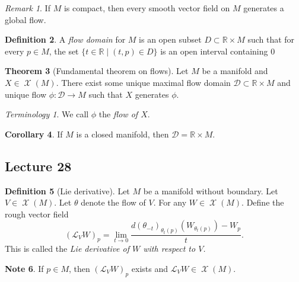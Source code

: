 \documentclass[10pt,letterpaper,cm]{nupset}
\theoremstyle{definition}
\newtheorem{definition}{Definition}[subsection]
\newtheorem{note}[definition]{Note}
\theoremstyle{theorem}
\newtheorem{theorem}[definition]{Theorem}
\newtheorem{corollary}[definition]{Corollary}
\theoremstyle{remark}
\newtheorem{remark}[definition]{Remark}
\newtheorem*{term}{Terminology}
\newcommand{\R}{\mathbb R}
\newcommand{\1}{\mathbf{1}}
\newcommand{\0}{\vec 0}
\DeclareMathOperator{\vf}{\mathscr{X}}
\begin{document}
\begin{remark}
If $M$ is compact, then every smooth vector field on $M$ generates a global flow.
\end{remark}

\begin{definition}
A \textit{flow domain} for $M$ is an open subset $D\subset \R \times M$ such that for every $p\in M$, the set $\{t\in \R \mid \left(t, p\right) \in D\}$ is an open interval containing $0$
\end{definition}

\begin{theorem}[Fundamental theorem on flows]
Let $M$ be a manifold and $X\in \vf(M)$. There exist some unique maximal flow domain $\mathcal{D}\subset \R \times M$ and unique flow $\phi: \mathcal{D}  \to M$ such that $X$ generates $\phi$.
\end{theorem}

\begin{term}
We call $\phi$ the \textit{flow of $X$}.
\end{term}

\begin{corollary}
If $M$ is a closed manifold, then $\mathcal{D} = \R \times M$.
\end{corollary}

\subsection{Lecture 28}

\begin{definition}[Lie derivative]
Let $M$ be a manifold without boundary. Let $V\in \vf(M)$. Let $\theta$ denote the flow of $V$. For any $W\in \vf(M)$. Define the rough vector field $$ \left(\mathcal{L}_VW\right)_p  = \lim_{t\to 0}\frac{d(\theta_{-t})_{\theta_t(p)}\left(W_{\theta_{t}(p)}\right)-W_p }{t}.$$ This is called the \textit{Lie derivative of $W$ with respect to $V$.}
\end{definition}

\begin{note}
If $p\in M$, then $(\mathcal{L}_VW)_p$ exists and $\mathcal{L}_VW \in \vf(M)$. 
\end{note}
\end{document}
